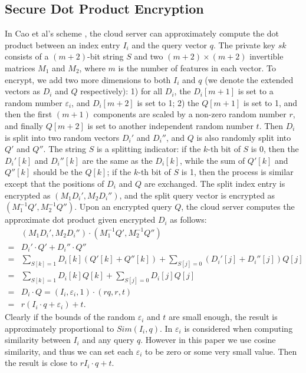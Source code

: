 \documentclass{IEEEtran}
\begin{document}
\subsection{Secure Dot Product Encryption}
In Cao et al's scheme \cite{Cao14}, the cloud server can approximately compute the dot product between an index entry $I_i$ and the query vector $q$. The private key $sk$ consists of a $(m+2)$-bit string $S$ and two $(m+2)\times (m+2)$ invertible matrices $M_1$ and $M_2$, where $m$ is the number of features in each vector. To encrypt, we add two more dimensions to both $I_i$ and $q$ (we denote the extended vectors as $D_i$ and $Q$ respectively): 1) for all $D_i$, the $D_i[m+1]$ is set to a random number $\varepsilon_i$, and $D_i[m+2]$ is set to 1; 2) the $Q[m+1]$ is set to 1, and then the first $(m+1)$ components are scaled by a non-zero random number $r$, and finally $Q[m+2]$ is set to another independent random number $t$. Then $D_i$ is split into two random vectors $D_i'$ and $D_i''$, and $Q$ is also randomly split into $Q'$ and $Q''$. The string $S$ is a splitting indicator: if the $k$-th bit of $S$ is 0, then the $D_i'[k]$ and $D_i''[k]$ are the same as the $D_i[k]$, while the sum of $Q'[k]$ and $Q''[k]$ should be the $Q[k]$; if the $k$-th bit of $S$ is 1, then the process is similar except that the positions of $D_i$ and $Q$ are exchanged. The split index entry is encrypted as $(M_1D_i', M_2D_i'')$, and the split query vector is encrypted as $(M_1^{-1}Q', M_2^{-1}Q'')$. Upon an encrypted query $Q$, the cloud server computes the approximate dot product given encrypted $D_i$ as follows:
\begin{equation*}
\begin{aligned}
&(M_1D_i', M_2D_i'')\cdot(M_1^{-1}Q', M_2^{-1}Q'') \\
=&D_i'\cdot Q' + D_i''\cdot Q''\\
=&\sum_{S[k]=1}D_i[k](Q'[k] + Q''[k]) + \sum_{S[j]=0} (D_i'[j]+ D_i''[j])Q[j]\\
=&\sum_{S[k]=1}D_i[k]Q[k] + \sum_{S[j]=0} D_i[j]Q[j]\\
=&D_i \cdot Q = (I_i,\varepsilon_i,1)\cdot (rq,r,t)\\
=&r(I_i\cdot q+\varepsilon_i)+t.
\end{aligned}
\end{equation*}
Clearly if the bounds of the random $\varepsilon_i$ and $t$ are small enough, the result is approximately proportional to $Sim(I_i, q)$. In \cite{Cao14} $\varepsilon_i$ is considered when computing similarity between $I_i$ and any query $q$. However in this paper we use cosine similarity, and thus we can set each $\varepsilon_i$ to be zero or some very small value. Then the result is close to $rI_i\cdot q+t$. 
\end{document}
